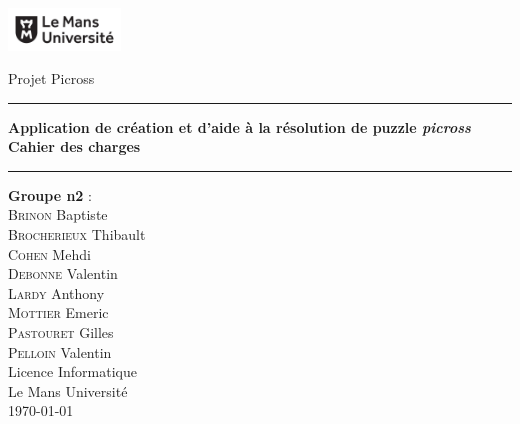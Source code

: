 \documentclass[a4paper, 12pt]{report}
\begin{document}
\begin{titlepage}



	\begin{spacing}{1.5}
			\begin{minipage}{0.4\textwidth}
					\includegraphics[width=3cm]{logo.png}
			\end{minipage}
			\begin{minipage}{0.5\textwidth}\raggedleft
					Projet Picross\\
			\end{minipage}
						\vspace*{\fill}

	\end{spacing}



	\begin{center}
		\begin{spacing}{2}
		    \hrule \vspace{1cm}
			\textbf{\Huge Application de création et d'aide à la résolution de puzzle \textit{picross}}\\[0.5cm]
			\textbf{\huge Cahier des charges} \\
			\vspace{1cm}
			\hrule

			\vspace*{\fill}


		\end{spacing}

		\begin{spacing}{1.15}
			\large\textbf{Groupe n\up{o}2} :\\
			\large
			\textsc{Brinon} Baptiste\\
			\textsc{Brocherieux} Thibault\\
			\textsc{Cohen} Mehdi\\
			\textsc{Debonne} Valentin\\
			\textsc{Lardy} Anthony\\
			\textsc{Mottier} Emeric\\
			\textsc{Pastouret} Gilles\\
			\textsc{Pelloin} Valentin\\
			\vspace*{\fill}
			\textnormal{\large Licence Informatique\\ Le Mans Université\\ \today}
		\end{spacing}
		
	\end{center}
\end{titlepage}
\end{document}
